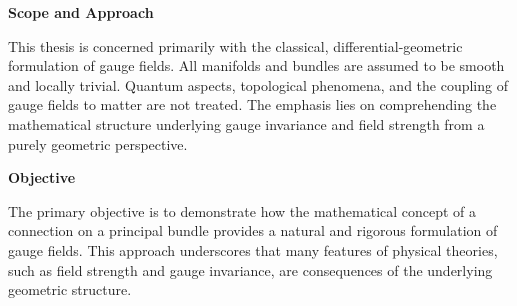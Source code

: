 \textbf{Scope and Approach}

This thesis is concerned primarily with the classical, differential-geometric formulation of gauge fields. All manifolds and bundles are assumed to be smooth and locally trivial. Quantum aspects, topological phenomena, and the coupling of gauge fields to matter are not treated. The emphasis lies on comprehending the mathematical structure underlying gauge invariance and field strength from a purely geometric perspective. 

\textbf{Objective}

The primary objective is to demonstrate how the mathematical concept of a connection on a principal bundle provides a natural and rigorous formulation of gauge fields. This approach underscores that many features of physical theories, such as field strength and gauge invariance, are consequences of the underlying geometric structure.
